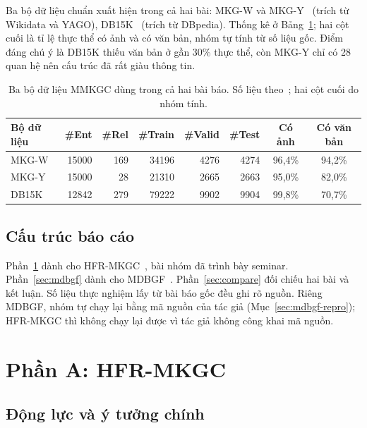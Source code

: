 \documentclass[conference,a4paper]{IEEEtran}
\begin{document}
Ba bộ dữ liệu chuẩn xuất hiện trong cả hai bài: MKG-W và MKG-Y~\cite{mkgwy} (trích từ Wikidata và YAGO), DB15K~\cite{mmkg} (trích từ DBpedia). Thống kê ở Bảng~\ref{tab:datasets}; hai cột cuối là tỉ lệ thực thể có ảnh và có văn bản, nhóm tự tính từ số liệu gốc. Điểm đáng chú ý là DB15K thiếu văn bản ở gần 30\% thực thể, còn MKG-Y chỉ có 28 quan hệ nên cấu trúc đã rất giàu thông tin.

\begin{table}[t]
\centering
\caption{Ba bộ dữ liệu MMKGC dùng trong cả hai bài báo. Số liệu theo~\cite{hfrmkgc}; hai cột cuối do nhóm tính.}
\label{tab:datasets}
\footnotesize
\setlength{\tabcolsep}{3pt}
\begin{tabular}{l rrrrr cc}
\toprule
Bộ dữ liệu & \#Ent & \#Rel & \#Train & \#Valid & \#Test & Có ảnh & Có văn bản\\
\midrule
MKG-W & 15000 & 169 & 34196 & 4276 & 4274 & 96{,}4\% & 94{,}2\%\\
MKG-Y & 15000 & 28  & 21310 & 2665 & 2663 & 95{,}0\% & 82{,}0\%\\
DB15K & 12842 & 279 & 79222 & 9902 & 9904 & 99{,}8\% & 70{,}7\%\\
\bottomrule
\end{tabular}
\end{table}

\subsection{Cấu trúc báo cáo}

Phần~\ref{sec:hfr} dành cho HFR-MKGC~\cite{hfrmkgc}, bài nhóm đã trình bày seminar. Phần~\ref{sec:mdbgf} dành cho MDBGF~\cite{mdbgf}. Phần~\ref{sec:compare} đối chiếu hai bài và kết luận. Số liệu thực nghiệm lấy từ bài báo gốc đều ghi rõ nguồn. Riêng MDBGF, nhóm tự chạy lại bằng mã nguồn của tác giả (Mục~\ref{sec:mdbgf-repro}); HFR-MKGC thì không chạy lại được vì tác giả không công khai mã nguồn.

\section{Phần A: HFR-MKGC}
\label{sec:hfr}

\subsection{Động lực và ý tưởng chính}
\label{sec:hfr-motivation}
\end{document}
